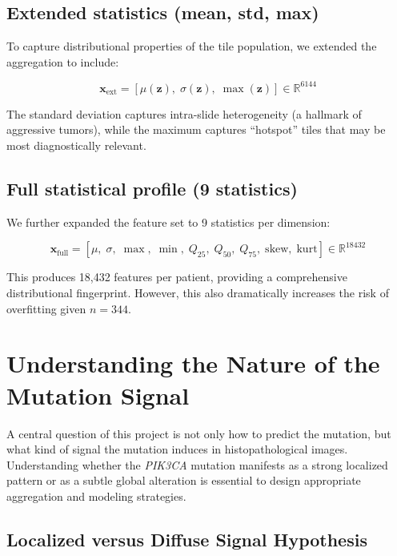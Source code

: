 \documentclass[11pt,a4paper]{article}
\begin{document}
\subsection{Extended statistics (mean, std, max)}
To capture distributional properties of the tile population, we extended the aggregation to include:

\begin{equation}
    \mathbf{x}_{\text{ext}} = \left[\mu(\mathbf{z}),\; \sigma(\mathbf{z}),\; \max(\mathbf{z})\right] \in \mathbb{R}^{6144}
\end{equation}

The standard deviation captures intra-slide heterogeneity (a hallmark of aggressive tumors), while the maximum captures ``hotspot'' tiles that may be most diagnostically relevant.

\subsection{Full statistical profile (9 statistics)}
We further expanded the feature set to 9 statistics per dimension:

\begin{equation}
    \mathbf{x}_{\text{full}} = \left[\mu,\; \sigma,\; \max,\; \min,\; Q_{25},\; Q_{50},\; Q_{75},\; \text{skew},\; \text{kurt}\right] \in \mathbb{R}^{18432}
\end{equation}

This produces 18,432 features per patient, providing a comprehensive distributional fingerprint. However, this also dramatically increases the risk of overfitting given $n=344$.

\newpage
\section{Understanding the Nature of the Mutation Signal}
\label{sec:signal}

A central question of this project is not only how to predict the mutation, but what kind of signal the mutation induces in histopathological images. 
Understanding whether the \textit{PIK3CA} mutation manifests as a strong localized pattern or as a subtle global alteration is essential to design appropriate aggregation and modeling strategies.

\subsection{Localized versus Diffuse Signal Hypothesis}
\end{document}

